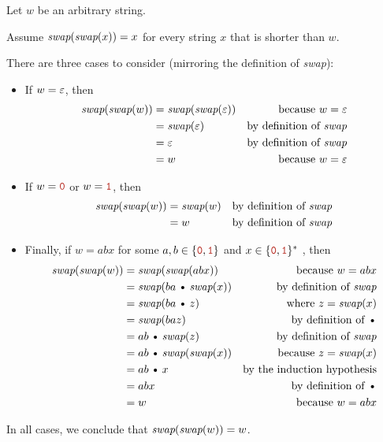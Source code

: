 \documentclass[11pt]{article}
\def\Cdot{\mathbin{\text{\normalfont \textbullet}}}
\def\Sym#1{\texttt{\color{BrickRed}#1}}
\begin{document}
\begin{enumerate}
\begin{enumerate}
\begin{Solution}
\parindent0pt
Let $w$ be an arbitrary string.

Assume $\emph{swap}(\emph{swap}(x)) = x$ for every string $x$ that is shorter than $w$.

There are three cases to consider (mirroring the definition of \emph{swap}):
\begin{itemize}
\item
If $w = \varepsilon$, then 
\begin{align*}
	\emph{swap}(\emph{swap}(w))
	&= \emph{swap}(\emph{swap}(\varepsilon))		& \text{because $w=\varepsilon$} \\
	&= \emph{swap}(\varepsilon)					& \text{by definition of \emph{swap}} \\
	&= \varepsilon								& \text{by definition of \emph{swap}} \\
	&= w								& \text{because $w=\varepsilon$}
\end{align*}
\item
If $w = \Sym0$ or $w = \Sym 1$, then 
\begin{align*}
	\emph{swap}(\emph{swap}(w))
	&= \emph{swap}(w)					& \text{by definition of \emph{swap}} \\
	&= w								& \text{by definition of \emph{swap}}
\end{align*}
\item
Finally, if $w = abx$ for some $a,b\in\set{\Sym0,\Sym1}$ and $x\in\set{\Sym0,\Sym1}^*$ , then
\begin{align*}
	\emph{swap}(\emph{swap}(w))
	&= \emph{swap}(\emph{swap}(abx))	& \text{because $w = abx$} \\
	&= \emph{swap}(ba\Cdot\emph{swap}(x))
										& \text{by definition of \emph{swap}} \\
	&= \emph{swap}(ba\Cdot z)
										& \text{where $z = \emph{swap}(x)$} \\
	&= \emph{swap}(baz)
										& \text{by definition of $\Cdot$} \\
	&= ab\Cdot \emph{swap}(z)
										& \text{by definition of \emph{swap}} \\
	&= ab\Cdot \emph{swap}(\emph{swap}(x))
										& \text{because $z = \emph{swap}(x)$} \\
	&= ab\Cdot x							& \text{by the induction hypothesis}\\
	&= abx 								& \text{by definition of $\Cdot$} \\
	&= w	 							& \text{because $w = abx$}
\end{align*}
\end{itemize}
In all cases, we conclude that $\emph{swap}(\emph{swap}(w)) = w$.
\end{Solution}
\unskip


\end{enumerate}
\end{enumerate}
\end{document}
